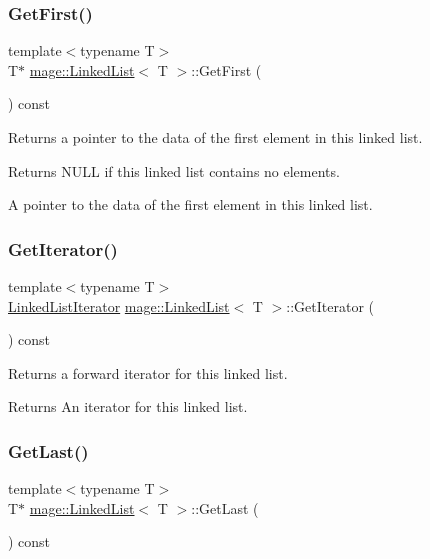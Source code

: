 \subsubsection{\texorpdfstring{Get\+First()}{GetFirst()}}
{\footnotesize\ttfamily template$<$typename T$>$ \\
T$\ast$ \hyperlink{classmage_1_1_linked_list}{mage\+::\+Linked\+List}$<$ T $>$\+::Get\+First (\begin{DoxyParamCaption}{ }\end{DoxyParamCaption}) const}

Returns a pointer to the data of the first element in this linked list.

\begin{DoxyReturn}{Returns}
{\ttfamily N\+U\+LL} if this linked list contains no elements. 

A pointer to the data of the first element in this linked list. 
\end{DoxyReturn}
\hypertarget{classmage_1_1_linked_list_a7e4016d051e44eb5d8a7bde3d193b9e8}{}\label{classmage_1_1_linked_list_a7e4016d051e44eb5d8a7bde3d193b9e8} 
\subsubsection{\texorpdfstring{Get\+Iterator()}{GetIterator()}}
{\footnotesize\ttfamily template$<$typename T$>$ \\
\hyperlink{structmage_1_1_linked_list_1_1_linked_list_iterator}{Linked\+List\+Iterator} \hyperlink{classmage_1_1_linked_list}{mage\+::\+Linked\+List}$<$ T $>$\+::Get\+Iterator (\begin{DoxyParamCaption}{ }\end{DoxyParamCaption}) const}

Returns a forward iterator for this linked list.

\begin{DoxyReturn}{Returns}
An iterator for this linked list. 
\end{DoxyReturn}
\hypertarget{classmage_1_1_linked_list_a734f6dc6d073edd99eb9a0ac1f605900}{}\label{classmage_1_1_linked_list_a734f6dc6d073edd99eb9a0ac1f605900} 
\subsubsection{\texorpdfstring{Get\+Last()}{GetLast()}}
{\footnotesize\ttfamily template$<$typename T$>$ \\
T$\ast$ \hyperlink{classmage_1_1_linked_list}{mage\+::\+Linked\+List}$<$ T $>$\+::Get\+Last (\begin{DoxyParamCaption}{ }\end{DoxyParamCaption}) const}

